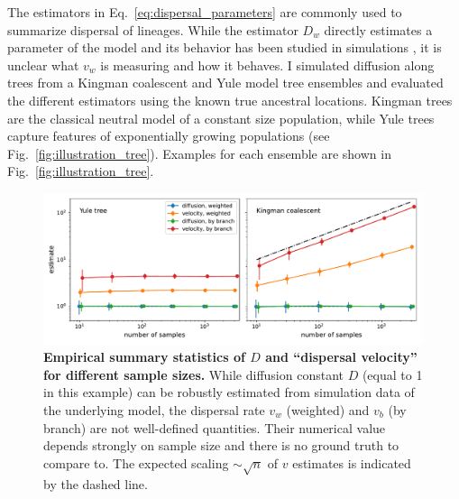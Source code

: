 \documentclass[aps,rmp, twocolumn]{revtex4}
\begin{document}
The estimators in Eq.~\ref{eq:dispersal_parameters} are commonly used to summarize dispersal of lineages.
While the estimator $D_w$ directly estimates a parameter of the model and its behavior has been studied in simulations \citep{pybus_unifying_2012}, it is unclear what $v_w$ is measuring and how it behaves.
I simulated diffusion along trees from a Kingman coalescent\citep{kingman_coalescent_1982} and Yule model \citep{yule_iimathematical_1925} tree ensembles and evaluated the different estimators using the known true ancestral locations.
Kingman trees are the classical neutral model of a constant size population, while Yule trees capture features of exponentially growing populations (see Fig.~\ref{fig:illustration_tree}).
Examples for each ensemble are shown in Fig.~\ref{fig:illustration_tree}.


\begin{figure}[tb]
    \includegraphics*[width=0.99\textwidth]{figures/dispersal_stats.pdf}
    \caption{\label{fig:D_and_v}{\bf Empirical summary statistics of $D$ and ``dispersal velocity'' for different sample sizes.}
    While diffusion constant $D$ (equal to 1 in this example) can be robustly estimated from simulation data of the underlying model, the dispersal rate $v_w$ (weighted) and $v_b$ (by branch) are not well-defined quantities. Their numerical value depends strongly on sample size and there is no ground truth to compare to. The expected scaling $\sim \sqrt{n}$ of $v$ estimates is indicated by the dashed line.}
\end{figure}
\end{document}
